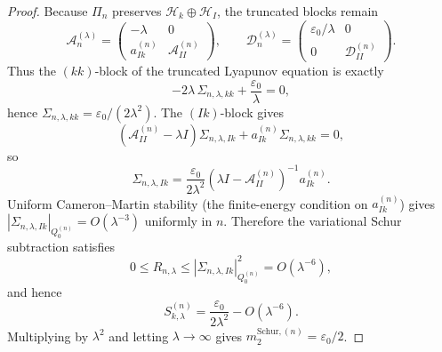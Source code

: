 \begin{proof}
Because $\Pi_n$ preserves $\mathcal{H}_k\oplus\mathcal{H}_I$, the truncated blocks remain
\begin{equation}
  \mathcal{A}_n^{(\lambda)}=
  \begin{pmatrix}-\lambda&0\\a_{Ik}^{(n)}&\mathcal{A}_{II}^{(n)}\end{pmatrix},
  \qquad
  \mathcal{D}_n^{(\lambda)}=
  \begin{pmatrix}\varepsilon_0/\lambda&0\\0&\mathcal{D}_{II}^{(n)}\end{pmatrix}.
\end{equation}
Thus the $(kk)$-block of the truncated Lyapunov equation is exactly
\begin{equation}
  -2\lambda\,\Sigma_{n,\lambda,kk}+\frac{\varepsilon_0}{\lambda}=0,
\end{equation}
hence $\Sigma_{n,\lambda,kk}=\varepsilon_0/(2\lambda^2)$.  The $(Ik)$-block gives
\begin{equation}
  (\mathcal{A}_{II}^{(n)}-\lambda I)\Sigma_{n,\lambda,Ik}+a_{Ik}^{(n)}\Sigma_{n,\lambda,kk}=0,
\end{equation}
so
\begin{equation}
  \Sigma_{n,\lambda,Ik}=\frac{\varepsilon_0}{2\lambda^2}(\lambda I-\mathcal{A}_{II}^{(n)})^{-1}a_{Ik}^{(n)}.
\end{equation}
Uniform Cameron--Martin stability (the finite-energy condition on $a_{Ik}^{(n)}$) gives $|\Sigma_{n,\lambda,Ik}|_{Q_0^{(n)}}=O(\lambda^{-3})$ uniformly in $n$.  Therefore the variational Schur subtraction satisfies
\begin{equation}
  0\le R_{n,\lambda}\le|\Sigma_{n,\lambda,Ik}|_{Q_0^{(n)}}^2=O(\lambda^{-6}),
\end{equation}
and hence
\begin{equation}
  S_{k,\lambda}^{(n)}=\frac{\varepsilon_0}{2\lambda^2}-O(\lambda^{-6}).
\end{equation}
Multiplying by $\lambda^2$ and letting $\lambda\to\infty$ gives $m_2^{\mathrm{Schur},(n)}=\varepsilon_0/2$.
\end{proof}

